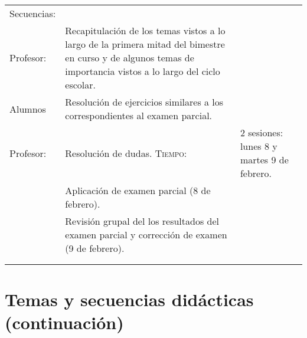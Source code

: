 \documentclass[letterpaper,10pt]{article}
\begin{document}
\begin{tabular}[t]{R{0.25\textwidth}p{0.71\textwidth}}
    \large{\sc Secuencias:} \\
    Profesor:   & Recapitulaci\'on de los temas vistos a lo largo de la primera 
    mitad del bimestre en curso y de algunos temas de importancia vistos a lo 
    largo del ciclo escolar. \\
    Alumnos     & Resoluci\'on de ejercicios similares a los correspondientes al
    examen parcial. \\
    Profesor:   & Resoluci\'on de dudas.
    \textsc{Tiempo:}& 2 sesiones: lunes 8 y martes 9  de febrero. \\
            & {\Large \sc Aplicaci\'on de examen parcial} (8 de febrero). \\           
            & Revisi\'on grupal del los resultados del examen parcial y
            correcci\'on de examen (9 de febrero).\\
\\ \hline \\
\end{tabular}

\newpage

\section{Temas  y secuencias did\'acticas (continuaci\'on)}
\end{document}
